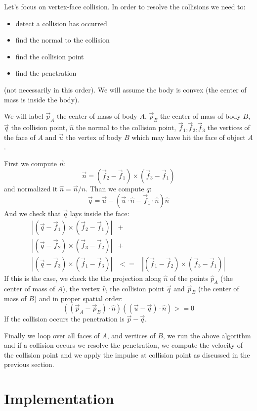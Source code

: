 \documentclass[12pt]{article}
\begin{document}
Let's focus on vertex-face collision. In order to resolve the collisions we need to:
\begin{itemize}
\item detect a collision has occurred
\item find the normal to the collision
\item find the collision point
\item find the penetration
\end{itemize}

(not necessarily in this order). We will assume the body is convex (the center of mass is inside the body).

We will label $\vec p_A$ the center of mass of body $A$, $\vec p_B$ the center of mass of body $B$, $\vec q$ the collision point, $\hat n$ the normal to the collision point, $\vec f_1$,$\vec f_2$,$\vec f_3$ the vertices of the face of $A$ and $\vec u$ the vertex of body $B$ which may have hit the face of object $A$.

First we compute $\vec n$:
\begin{equation}
\vec n = (\vec f_2 - \vec f_1) \times (\vec f_3 - \vec f_1)
\end{equation}
and normalized it $\hat n = \vec n / n$.
Than we compute $q$:
\begin{equation}
\vec q = \vec u - (\vec u \cdot \hat n - \vec f_1 \cdot \hat n){\hat n}
\end{equation}
And we check that $\vec q$ lays inside the face:
\begin{eqnarray}
|(\vec q - \vec f_1)\times(\vec f_2-\vec f_1)|&+& \\
|(\vec q - \vec f_2)\times(\vec f_3-\vec f_2)|&+& \\
|(\vec q - \vec f_3)\times(\vec f_1-\vec f_3)| &<=& |(\vec f_1 - \vec f_2)\times(\vec f_3-\vec f_1)|
\end{eqnarray}
If this is the case, we check the the projection along $\hat n$ of the points $\hat p_A$ (the center of mass of $A$), the vertex $\hat v$, the collision point $\vec q$ and $\vec p_B$ (the center of mass of $B$) and in proper spatial order:
\begin{equation}
((\vec p_A - \vec p_B) \cdot \hat n) ((\vec u - \vec q) \cdot\hat n) >=0
\end{equation}
If the collision occurs the penetration is $\vec p - \vec q$.

Finally we loop over all faces of $A$, and vertices of $B$, we run the above algorithm and if a collision occurs we resolve the penetration, we compute the velocity of the collision point and we apply the impulse at collision point as discussed in the previous section.

\section{Implementation}


\end{document}
